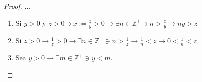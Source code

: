 \begin{proof}
...
\begin{enumerate}
    \item Si $y>0$ y $z>0\ni x:=\frac{z}{y}>0\to \exists n\in \mathbb{Z}^+\ni n>\frac{z}{y}\to ny>z$
    \item Si $z>0\to \frac{1}{z}>0\to \exists n \in \mathbb{Z}^+\ni n>\frac{1}{z}\to \frac{1}{n}<z\to  0<\frac{1}{n}<z$
    \item Sea $y>0\to\exists m\in \mathbb{Z}^+\ni y<m.$
    \begin{center}
        


\begin{tikzpicture}[x=0.75pt,y=0.75pt,yscale=-1,xscale=1]


\end{tikzpicture}
\end{center}
\end{enumerate}
\end{proof}
